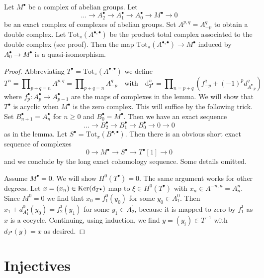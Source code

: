 \begin{lemma}
\label{lemma-resolution-gives-qis}
Let $M^\bullet$ be a complex of abelian groups. Let
$$
\ldots \to A_2^\bullet \to A_1^\bullet \to A_0^\bullet \to M^\bullet \to 0
$$
be an exact complex of complexes of abelian groups. Set $A^{p, q} = A_{-p}^q$
to obtain a double complex. Let $\text{Tot}_\pi(A^{\bullet, \bullet})$
be the product total complex associated to the double complex (see proof).
Then the map $\text{Tot}_\pi(A^{\bullet, \bullet}) \to M^\bullet$
induced by $A_0^\bullet \to M^\bullet$ is a quasi-isomorphism.
\end{lemma}

\begin{proof}
Abbreviating $T^\bullet = \text{Tot}_\pi(A^{\bullet, \bullet})$
we define
$$
T^n = \prod\nolimits_{p + q = n} A^{p, q} =
\prod\nolimits_{p + q = n} A_{-p}^q
\quad\text{with}\quad
\text{d}_{T^\bullet}^n =
\prod\nolimits_{n = p + q} (f_{-p}^q + (-1)^pd_{A_{-p}^\bullet}^q)
$$
where $f_p^\bullet : A_p^\bullet \to A_{p - 1}^\bullet$
are the maps of complexes in the lemma.
We will show that $T^\bullet$ is acyclic when
$M^\bullet$ is the zero complex. This will suffice by
the following trick. Set $B_{n + 1}^\bullet = A_n^\bullet$ for $n \geq 0$
and $B_0^\bullet = M^\bullet$. Then we have an exact sequence
$$
\ldots \to B_2^\bullet \to B_1^\bullet \to B_0^\bullet \to 0 \to 0
$$
as in the lemma. Let $S^\bullet = \text{Tot}_\pi(B^{\bullet, \bullet})$.
Then there is an obvious short exact sequence of complexes
$$
0 \to M^\bullet \to S^\bullet \to T^\bullet[1] \to 0
$$
and we conclude by the long exact cohomology sequence. Some details omitted.

\medskip\noindent
Assume $M^\bullet = 0$. We will show $H^0(T^\bullet) = 0$. The same argument
works for other degrees. Let $x =(x_n) \in \mathop{\mathrm{Ker}}(d_{T^\bullet})$
map to $\xi \in H^0(T^\bullet)$ with $x_n \in A^{-n, n} = A_n^n$.
Since $M^0 = 0$ we find that $x_0 = f_1^0(y_0)$ for some $y_0 \in A_1^0$.
Then $x_1 + d^0_{A_1^\bullet}(y_0) = f_2^1(y_1)$ for some
$y_1 \in A_2^1$, because it is mapped to zero by $f_1^1$
as $x$ is a cocycle. Continuing, using induction, we find
$y = (y_i) \in T^{-1}$ with $d_{T^\bullet}(y) = x$ as desired.
\end{proof}







\section{Injectives}
\label{section-injectives}

